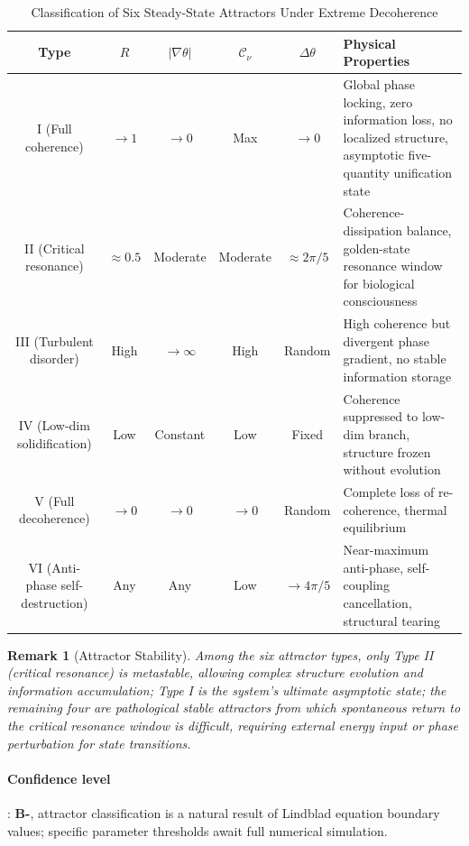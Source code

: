\documentclass[12pt,a4paper,twocolumn]{article}
\newtheorem{remark}[theorem]{Remark}
\begin{document}
\begin{table}[H]
\centering
\footnotesize
\caption{Classification of Six Steady-State Attractors Under Extreme Decoherence}
\begin{tabular}{c|c|c|c|c|p{3.5cm}}
\hline
\textbf{Type} & $R$ & $|\nabla\theta|$ & $\mathcal{C}_\nu$ & $\Delta\theta$ & \textbf{Physical Properties} \\
\hline
I (Full coherence) & $\to1$ & $\to0$ & Max & $\to0$ & Global phase locking, zero information loss, no localized structure, asymptotic five-quantity unification state \\
II (Critical resonance) & $\approx0.5$ & Moderate & Moderate & $\approx2\pi/5$ & Coherence-dissipation balance, golden-state resonance window for biological consciousness \\
III (Turbulent disorder) & High & $\to\infty$ & High & Random & High coherence but divergent phase gradient, no stable information storage \\
IV (Low-dim solidification) & Low & Constant & Low & Fixed & Coherence suppressed to low-dim branch, structure frozen without evolution \\
V (Full decoherence) & $\to0$ & $\to0$ & $\to0$ & Random & Complete loss of re-coherence, thermal equilibrium \\
VI (Anti-phase self-destruction) & Any & Any & Low & $\to4\pi/5$ & Near-maximum anti-phase, self-coupling cancellation, structural tearing \\
\hline
\end{tabular}
\end{table}

\begin{remark}[Attractor Stability]
Among the six attractor types, only Type II (critical resonance) is metastable, allowing complex structure evolution and information accumulation; Type I is the system's ultimate asymptotic state; the remaining four are pathological stable attractors from which spontaneous return to the critical resonance window is difficult, requiring external energy input or phase perturbation for state transitions.
\end{remark}

\paragraph{Confidence level}: \textbf{B-}, attractor classification is a natural result of Lindblad equation boundary values; specific parameter thresholds await full numerical simulation.
\end{document}
